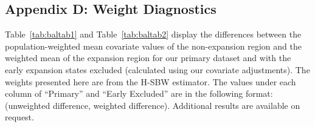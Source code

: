 \documentclass[12pt]{article}
\begin{document}
\subsection{Appendix D: Weight Diagnostics}
\label{ssec:balancetables}

Table~\ref{tab:baltab1} and Table~\ref{tab:baltab2} display the differences between the population-weighted mean covariate values of the non-expansion region and the weighted mean of the expansion region for our primary dataset and with the early expansion states excluded (calculated using our covariate adjustments). The weights presented here are from the H-SBW estimator. The values under each column of ``Primary'' and ``Early Excluded'' are in the following format: (unweighted difference, weighted difference). Additional results are available on request.
\end{document}
